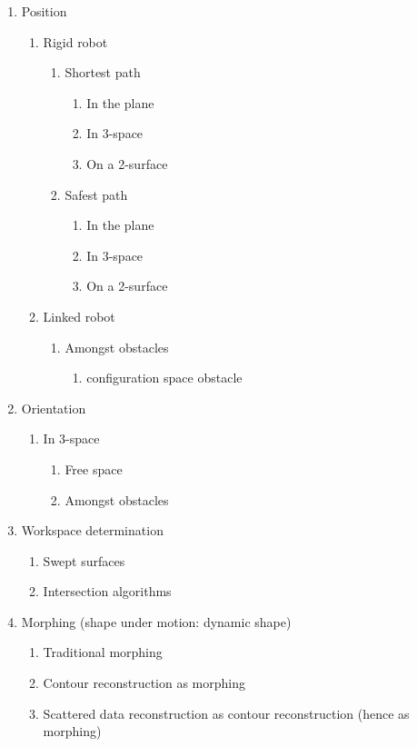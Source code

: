 \documentclass[11pt,titlepage]{article}
\begin{document}
\begin{enumerate}
\item Position
\begin{enumerate}
\item Rigid robot
\begin{enumerate}
\item Shortest path
\begin{enumerate}
\item In the plane %
\item In 3-space
\item On a 2-surface
\end{enumerate}
\item Safest path
\begin{enumerate}
\item In the plane %
\item In 3-space
\item On a 2-surface
\end{enumerate}
\end{enumerate}
\item Linked robot
\begin{enumerate}
\item Amongst obstacles
\begin{enumerate}
\item configuration space obstacle
\end{enumerate}
\end{enumerate}
\end{enumerate}

\item Orientation
\begin{enumerate}
\item In 3-space 
\begin{enumerate}
\item Free space %
\item Amongst obstacles
\end{enumerate}
\end{enumerate}

\item Workspace determination
\begin{enumerate}
\item Swept surfaces %
\item Intersection algorithms %
\end{enumerate}

\item Morphing (shape under motion: dynamic shape)
\begin{enumerate}
\item Traditional morphing
\item Contour reconstruction as morphing %
\item Scattered data reconstruction as contour reconstruction
	(hence as morphing)
\end{enumerate}
\end{enumerate}
\end{document}
